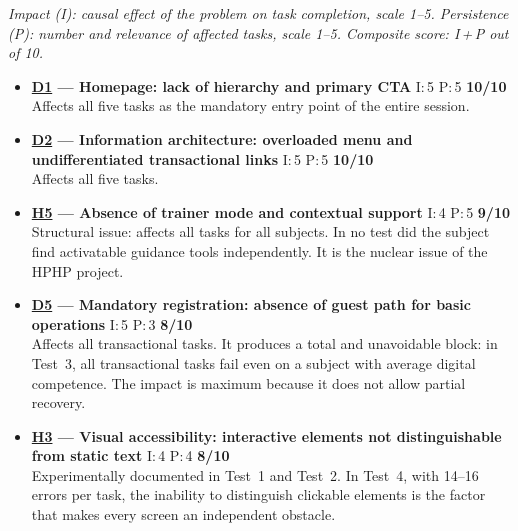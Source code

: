 ﻿\documentclass[11pt,a4paper]{article}
\begin{document}
\noindent\textit{Impact (I): causal effect of the problem on task completion,
scale 1--5. Persistence (P): number and relevance of affected tasks,
scale 1--5. Composite score: I\,+\,P out of 10.}

\begin{tcolorbox}[base]
\begin{itemize}[leftmargin=*,itemsep=8pt]

    \item \textbf{\hyperref[iss:D1]{D1} --- Homepage: lack of hierarchy
    and primary CTA}
    \hfill I:\,5 \textbar{} P:\,5 \textbar{} \textbf{10/10}\\
    Affects all five tasks as the mandatory entry point
    of the entire session.

    \item \textbf{\hyperref[iss:D2]{D2} --- Information architecture:
    overloaded menu and undifferentiated transactional links}
    \hfill I:\,5 \textbar{} P:\,5 \textbar{} \textbf{10/10}\\
    Affects all five tasks.

    \item \textbf{\hyperref[iss:H5]{H5} --- Absence of trainer mode
    and contextual support}
    \hfill I:\,4 \textbar{} P:\,5 \textbar{} \textbf{9/10}\\
    Structural issue: affects all tasks for all subjects.
    In no test did the subject find activatable guidance tools
    independently. It is the nuclear issue of the
    HPHP project.

    \item \textbf{\hyperref[iss:D5]{D5} --- Mandatory registration:
    absence of guest path for basic operations}
    \hfill I:\,5 \textbar{} P:\,3 \textbar{} \textbf{8/10}\\
    Affects all transactional tasks. It produces a total
    and unavoidable block: in Test~3, all transactional tasks
    fail even on a subject with average digital competence.
    The impact is maximum because it does not allow partial recovery.

    \item \textbf{\hyperref[iss:H3]{H3} --- Visual accessibility:
    interactive elements not distinguishable from static text}
    \hfill I:\,4 \textbar{} P:\,4 \textbar{} \textbf{8/10}\\
    Experimentally documented in Test~1 and Test~2.
    In Test~4, with 14--16 errors per task, the inability to distinguish
    clickable elements is the factor that makes every screen an independent
    obstacle.


\end{itemize}
\end{tcolorbox}
\end{document}
